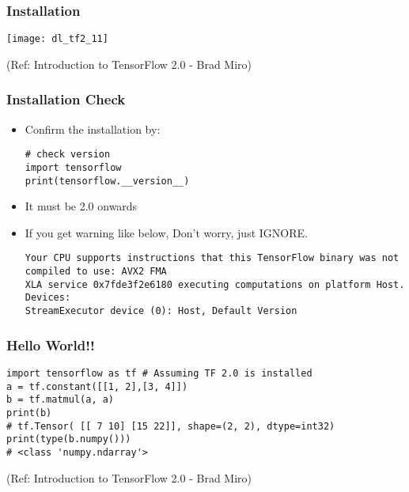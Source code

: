 \begin{frame}[fragile] \frametitle{Installation}

\begin{center}
\texttt{[image: dl\_tf2\_11]}
\end{center}


\tiny{(Ref: Introduction to TensorFlow 2.0 - Brad Miro)}
\end{frame}

\begin{frame}[fragile] \frametitle{Installation Check}

\begin{itemize}
\item Confirm the installation by:
\begin{lstlisting}
# check version
import tensorflow
print(tensorflow.__version__)
\end{lstlisting}
\item It must be 2.0 onwards
\item If you get warning like below, Don't worry, just IGNORE.
\begin{lstlisting}
Your CPU supports instructions that this TensorFlow binary was not compiled to use: AVX2 FMA
XLA service 0x7fde3f2e6180 executing computations on platform Host. Devices:
StreamExecutor device (0): Host, Default Version
\end{lstlisting}

\end{itemize}

\end{frame}

\begin{frame}[fragile] \frametitle{Hello World!!}

\begin{lstlisting}
import tensorflow as tf # Assuming TF 2.0 is installed
a = tf.constant([[1, 2],[3, 4]])
b = tf.matmul(a, a)
print(b) 
# tf.Tensor( [[ 7 10] [15 22]], shape=(2, 2), dtype=int32)
print(type(b.numpy()))
# <class 'numpy.ndarray'>
\end{lstlisting}


\tiny{(Ref: Introduction to TensorFlow 2.0 - Brad Miro)}
\end{frame}


